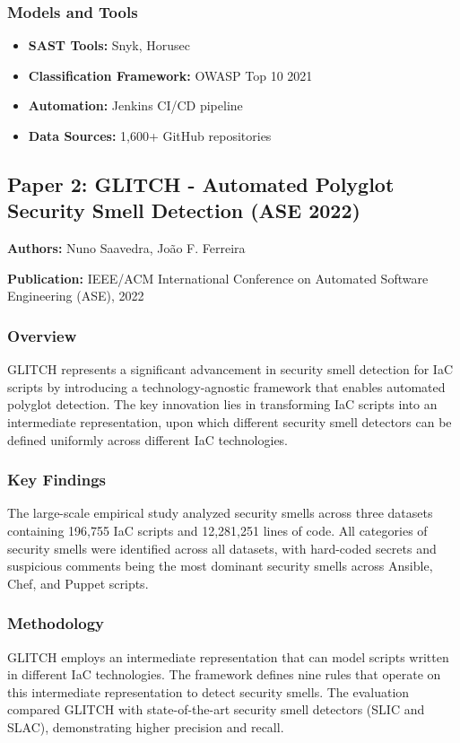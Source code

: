 \documentclass[11pt,a4paper]{article}
\begin{document}
\subsubsection{Models and Tools}
\begin{itemize}
    \item \textbf{SAST Tools:} Snyk, Horusec
    \item \textbf{Classification Framework:} OWASP Top 10 2021
    \item \textbf{Automation:} Jenkins CI/CD pipeline
    \item \textbf{Data Sources:} 1,600+ GitHub repositories
\end{itemize}

\subsection{Paper 2: GLITCH - Automated Polyglot Security Smell Detection (ASE 2022)}

\textbf{Authors:} Nuno Saavedra, João F. Ferreira

\textbf{Publication:} IEEE/ACM International Conference on Automated Software Engineering (ASE), 2022

\subsubsection{Overview}
GLITCH represents a significant advancement in security smell detection for IaC scripts by introducing a technology-agnostic framework that enables automated polyglot detection. The key innovation lies in transforming IaC scripts into an intermediate representation, upon which different security smell detectors can be defined uniformly across different IaC technologies.

\subsubsection{Key Findings}
The large-scale empirical study analyzed security smells across three datasets containing 196,755 IaC scripts and 12,281,251 lines of code. All categories of security smells were identified across all datasets, with hard-coded secrets and suspicious comments being the most dominant security smells across Ansible, Chef, and Puppet scripts.

\subsubsection{Methodology}
GLITCH employs an intermediate representation that can model scripts written in different IaC technologies. The framework defines nine rules that operate on this intermediate representation to detect security smells. The evaluation compared GLITCH with state-of-the-art security smell detectors (SLIC and SLAC), demonstrating higher precision and recall.
\end{document}
